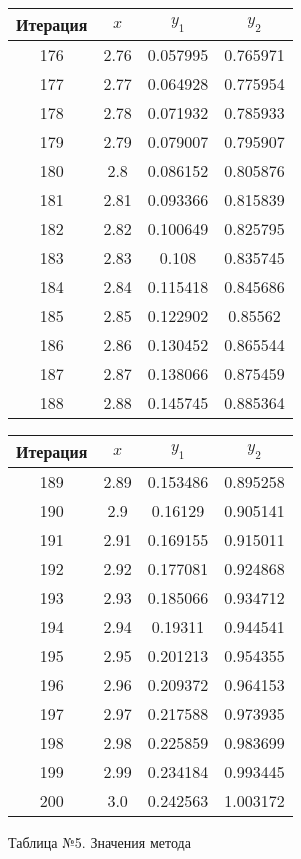 \begin{center}
\begin{tabular}{|c|c|c|c|}
	\hline
	Итерация & $ x $ & $ y_{1} $ & $ y_{2} $\\
	\hline
		176 & 2.76 & 0.057995 & 0.765971 \\
		\hline
		177 & 2.77 & 0.064928 & 0.775954 \\
		\hline
		178 & 2.78 & 0.071932 & 0.785933 \\
		\hline
		179 & 2.79 & 0.079007 & 0.795907 \\
		\hline
		180 & 2.8 & 0.086152 & 0.805876 \\
		\hline
		181 & 2.81 & 0.093366 & 0.815839 \\
		\hline
		182 & 2.82 & 0.100649 & 0.825795 \\
		\hline
		183 & 2.83 & 0.108 & 0.835745 \\
		\hline
		184 & 2.84 & 0.115418 & 0.845686 \\
		\hline
		185 & 2.85 & 0.122902 & 0.85562 \\
		\hline
		186 & 2.86 & 0.130452 & 0.865544 \\
		\hline
		187 & 2.87 & 0.138066 & 0.875459 \\
		\hline
		188 & 2.88 & 0.145745 & 0.885364 \\
		\hline
	\end{tabular}
\begin{tabular}{|c|c|c|c|}
\hline
Итерация & $ x $ & $ y_{1} $ & $ y_{2} $\\
\hline
		189 & 2.89 & 0.153486 & 0.895258 \\
		\hline
		190 & 2.9 & 0.16129 & 0.905141 \\
		\hline
		191 & 2.91 & 0.169155 & 0.915011 \\
		\hline
		192 & 2.92 & 0.177081 & 0.924868 \\
		\hline
		193 & 2.93 & 0.185066 & 0.934712 \\
		\hline
		194 & 2.94 & 0.19311 & 0.944541 \\
		\hline
		195 & 2.95 & 0.201213 & 0.954355 \\
		\hline
		196 & 2.96 & 0.209372 & 0.964153 \\
		\hline
		197 & 2.97 & 0.217588 & 0.973935 \\
		\hline
		198 & 2.98 & 0.225859 & 0.983699 \\
		\hline
		199 & 2.99 & 0.234184 & 0.993445 \\
		\hline
		200 & 3.0 & 0.242563 & 1.003172 \\
		\hline
\end{tabular}
\end{center}
\begin{center}
	\color{blue}
	Таблица №5. Значения метода
\end{center}